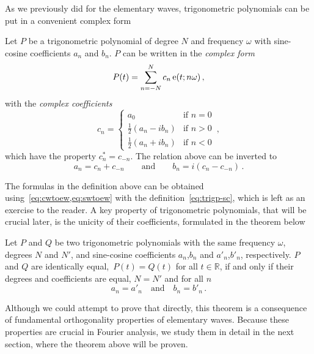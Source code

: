 As we previously did for the elementary waves, trigonometric polynomials can be put in a
convenient complex form
\begin{definition}
  \label{def:trigp-complex}
  Let $P$ be a trigonometric polynomial of degree $N$ and frequency $\omega$ with
  sine-cosine coefficients $a_n$ and $b_n$. $P$ can be written in the \emph{complex form}
  \begin{equation}
    P(t)=\sum_{n=-N}^{N}c_n\operatorname{e}(t;n\omega)\,,\label{eq:trigp-complex}
  \end{equation}
  with the \emph{complex coefficients}
  \begin{equation}
    c_n =
    \begin{cases}
      a_0 &\text{if~}n=0\\
      \frac{1}{2}(a_n-ib_n)&\text{if~}n>0\\
      \frac{1}{2}(a_n+ib_n)&\text{if~}n<0
    \end{cases}
    \,,\label{eq:ab-to-c}
  \end{equation}
  which have the property $c_n^*=c_{-n}$. The relation above can be inverted to
  \begin{equation}
    a_n=c_n+c_{-n}\qquad\text{and}\qquad
    b_n=i(c_n-c_{-n})\,.
  \end{equation}
\end{definition}
The formulas in the definition above can be obtained using~\cref{eq:cwtoew,eq:swtoew} with
the definition~\cref{eq:trigp-sc}, which is left as an exercise to the reader. A key
property of trigonometric polynomials, that will be crucial later, is the unicity of their
coefficients, formulated in the theorem below
\begin{theorem}
  \label{thm:trigp-unicity}
  Let $P$ and $Q$ be two trigonometric polynomials with the same frequency $\omega$,
  degrees $N$ and $N'$, and sine-cosine coefficients $a_n$,$b_n$ and $a'_n$,$b'_n$,
  respectively. $P$ and $Q$ are identically equal,~\ie $P(t)=Q(t)$ for all $t\in\mathbb{R}$, if and
  only if their degrees and coefficients are equal, \ie $N=N'$ and for all $n$
  \begin{equation}
    a_n=a'_n\quad\text{and}\quad b_n=b'_n\,.
  \end{equation}
\end{theorem}
Although we could attempt to prove that directly, this theorem is a consequence of
fundamental orthogonality properties of elementary waves. Because these properties are crucial in Fourier analysis, we  study them in detail in the next section, where the theorem above will be proven.

